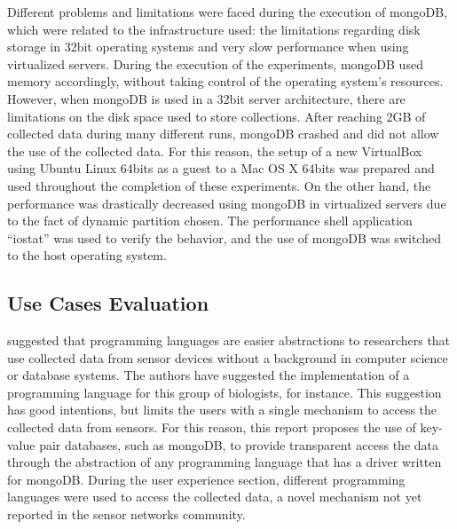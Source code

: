 Different problems and limitations were faced during the execution of
mongoDB, which were related to the infrastructure used: the limitations
regarding disk storage in 32bit operating systems and very slow
performance when using virtualized servers. During the execution of the
experiments, mongoDB used memory accordingly, without taking control of the
operating system's resources. However, when mongoDB is used in a 32bit server
architecture, there are limitations on the disk space used to store
collections. After reaching 2GB of collected data during many different runs,
mongoDB crashed and did not allow the use of the collected data. For this
reason, the setup of a new VirtualBox using Ubuntu Linux 64bits as a guest to
a Mac OS X 64bits was prepared and used throughout the completion of these
experiments. On the other hand, the performance was drastically decreased 
using mongoDB in virtualized servers due to the fact of dynamic partition
chosen. The performance shell application ``iostat'' was used to verify the
behavior, and the use of mongoDB was switched to the host operating system.

\subsection{Use Cases Evaluation}

\cite{sn-programming-language} suggested that programming languages are easier
abstractions to researchers that use collected data from sensor devices
without a background in computer science or database systems. The authors have
suggested the implementation of a programming language for this group of
biologists, for instance. This suggestion has good intentions, but
limits the users with a single mechanism to access the collected data from
sensors. For this reason, this report proposes the use of key-value pair
databases, such as mongoDB, to provide transparent access the data through
the abstraction of any programming language that has a driver written for
mongoDB. During the user experience section, different programming languages
were used to access the collected data, a novel mechanism not yet reported in
the sensor networks community.

